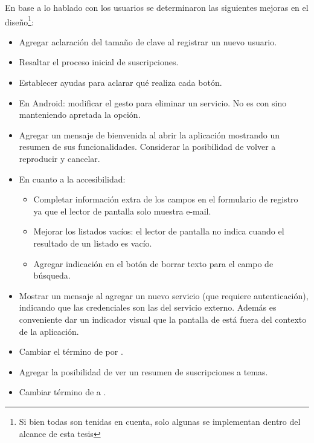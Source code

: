 En base a lo hablado con los usuarios se determinaron las siguientes mejoras en el diseño\footnote{Si bien todas son tenidas en cuenta, solo algunas se implementan dentro del alcance de esta tesis}:
\begin{itemize}
\item Agregar aclaración del tamaño de clave al registrar un nuevo usuario. 
\item Resaltar el proceso inicial de suscripciones.
\item Establecer ayudas para aclarar qué realiza cada botón.
\item En Android: modificar el gesto para eliminar un servicio. No es con  sino manteniendo apretada la opción.
\item Agregar un mensaje de bienvenida al abrir la aplicación mostrando un resumen de sus funcionalidades. Considerar la posibilidad de volver a reproducir y cancelar.
\item En cuanto a la accesibilidad:
\begin{itemize}
\item Completar información extra de los campos en el formulario de registro ya que el lector de pantalla solo muestra e-mail.
\item Mejorar los listados vacíos: el lector de pantalla no indica cuando el resultado de un listado es vacío.
\item Agregar indicación en el botón de borrar texto para el campo de búsqueda. 
\end{itemize}
\item Mostrar un mensaje al agregar un nuevo servicio (que requiere autenticación), indicando que las credenciales son las del servicio externo. Además es conveniente dar un indicador visual que la pantalla de   está fuera del contexto de la aplicación.
\item Cambiar el término de  por .
\item Agregar la posibilidad de ver un resumen de suscripciones a temas.
\item Cambiar término de  a .
\end{itemize}

